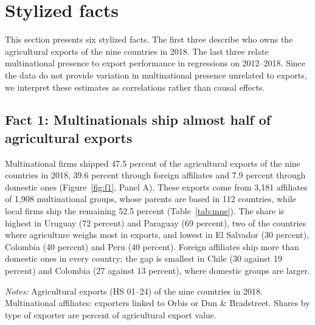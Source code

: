 \section{Stylized facts}\label{sec:results}
This section presents six stylized facts. The first three describe who owns the agricultural exports of the
nine countries in 2018. The last three relate multinational presence to export performance in regressions on
2012--2018. Since the data do not provide variation in multinational presence unrelated to exports, we interpret
these estimates as correlations rather than causal effects.

\subsection{Fact 1: Multinationals ship almost half of agricultural exports}\label{sec:owners}

Multinational firms shipped 47.5 percent of the agricultural exports of the nine countries in 2018, 39.6 percent
through foreign affiliates and 7.9 percent through domestic ones (Figure~\ref{fig:f1}, Panel A). These exports come
from 3,181 affiliates of 1,908 multinational groups, whose parents are based in 112 countries, while local firms ship
the remaining 52.5 percent (Table~\ref{tab:mne}). The share is highest in Uruguay (72 percent) and Paraguay (69
percent), two of the countries where agriculture weighs most in exports, and lowest in El Salvador (30 percent),
Colombia (40 percent) and Peru (40 percent). Foreign affiliates ship more than domestic ones in every country; the
gap is smallest in Chile (30 against 19 percent) and Colombia (27 against 13 percent), where domestic groups are
larger.
\begin{table}[htbp]
\centering
\caption{Multinational firms in agricultural exports, 2018}
\label{tab:mne}
{\small\setlength{\tabcolsep}{4pt}\setlength{\extrarowheight}{1pt}
}

\begin{minipage}{0.95\linewidth}
\notesize
\vspace{0.6em}
\textit{Notes:} Agricultural exports (HS 01--24) of the nine countries in 2018. Multinational affiliates: exporters linked to Orbis or Dun \& Bradstreet. Shares by type of exporter are percent of agricultural export value.\\
\srcnote
\end{minipage}
\end{table}


